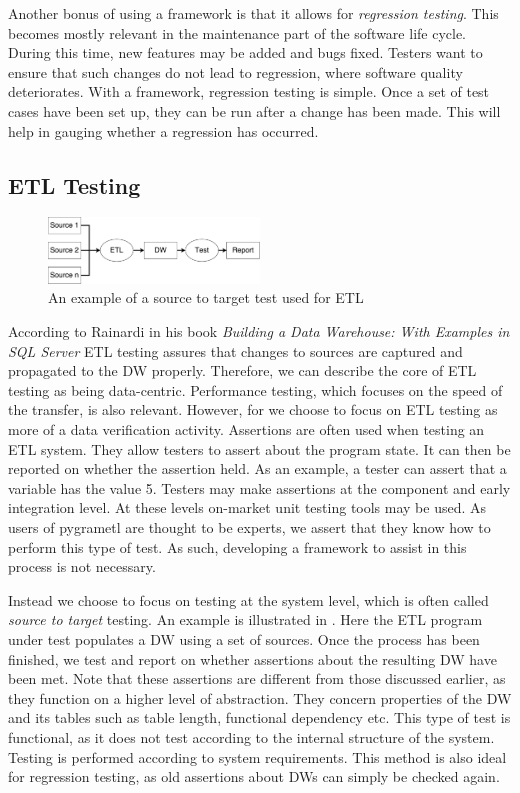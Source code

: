 Another bonus of using a framework is that it allows for \emph{regression testing}. This becomes mostly relevant in the maintenance part of the software life cycle. During this time, new features may be added and bugs fixed. Testers want to ensure that such changes do not lead to regression, where software quality deteriorates. With a framework, regression testing is simple. Once a set of test cases have been set up, they can be run after a change has been made. This will help in gauging whether a regression has occurred.

\subsection{ETL Testing}

\begin{figure}
\centering
\includegraphics[width=0.5\textwidth]{figures/scenario.pdf}
\caption{An example of a source to target test used for ETL}
\label{fig:sourcetotarget}
\end{figure}

According to Rainardi in his book \textit{Building a Data Warehouse: With Examples in SQL Server}\cite{rainardi2007building} ETL testing assures that changes to sources are captured and propagated to the DW properly. Therefore, we can describe the core of ETL testing as being data-centric. Performance testing, which focuses on the speed of the transfer, is also relevant. However, for \FW{} we choose to focus on ETL testing as more of a data verification activity. Assertions are often used when testing an ETL system. They allow testers to assert about the program state. It can then be reported on whether the assertion held. As an example, a tester can assert that a variable has the value 5. Testers may make assertions at the component and early integration level. At these levels on-market unit testing tools may be used. As users of pygrametl are thought to be experts, we assert that they know how to perform this type of test. As such, developing a framework to assist in this process is not necessary.

Instead we choose to focus on testing at the system level, which is often called \emph{source to target} testing. An example is illustrated in . Here the ETL program under test populates a DW using a set of sources. Once the process has been finished, we test and report on whether assertions about the resulting DW have been met. Note that these assertions are different from those discussed earlier, as they function on a higher level of abstraction. They concern properties of the DW and its tables such as table length, functional dependency etc. This type of test is functional, as it does not test according to the internal structure of the system. Testing is performed according to system requirements. This method is also ideal for regression testing, as old assertions about DWs can simply be checked again.

